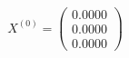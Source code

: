\documentclass[preview]{standalone}
\begin{document}
\begin{align*}
X^{(0)} = \begin{pmatrix} 0.0000 \\ 0.0000 \\ 0.0000 \end{pmatrix}
\end{align*}
\end{document}
